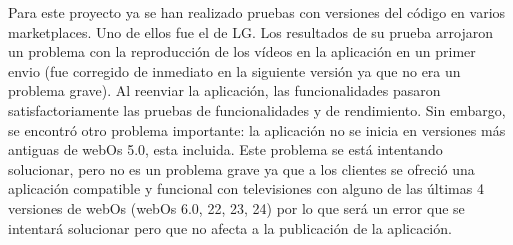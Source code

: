 Para este proyecto ya se han realizado pruebas con versiones del código en varios marketplaces. Uno de ellos fue el de LG. Los 
resultados de su prueba arrojaron un problema con la reproducción de los vídeos en la aplicación en un primer envio (fue corregido de 
inmediato en la siguiente versión ya que no era un problema grave). Al reenviar la aplicación, las funcionalidades pasaron satisfactoriamente
las pruebas de funcionalidades y de rendimiento. Sin embargo, se encontró otro problema importante: la aplicación no se inicia en 
versiones más antiguas de webOs 5.0, esta incluida. Este problema se está intentando solucionar, pero no es un problema grave ya que
a los clientes se ofreció una aplicación compatible y funcional con televisiones con alguno de las últimas 4 versiones de webOs
(webOs 6.0, 22, 23, 24) por lo que será un error que se intentará solucionar pero que no afecta a la publicación de la aplicación.


